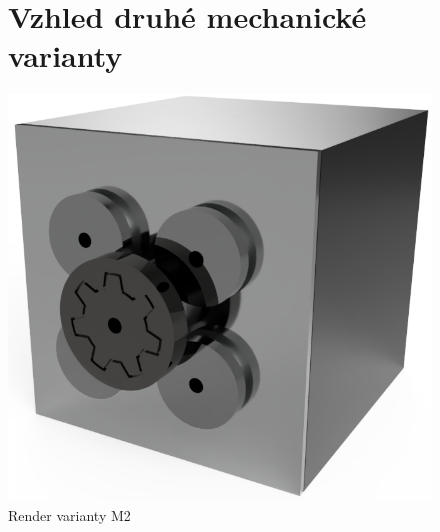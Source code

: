 \begin{figure}
	\section{Vzhled druhé mechanické varianty}
	\vspace{\OdsazeniNadpisu}
    \centering
    \includegraphics[width=\textwidth]{kapitoly/obrazky/M2/predni_render.PNG}
    \caption{Render varianty M2}
    \label{fig:M2-render}
\end{figure}



